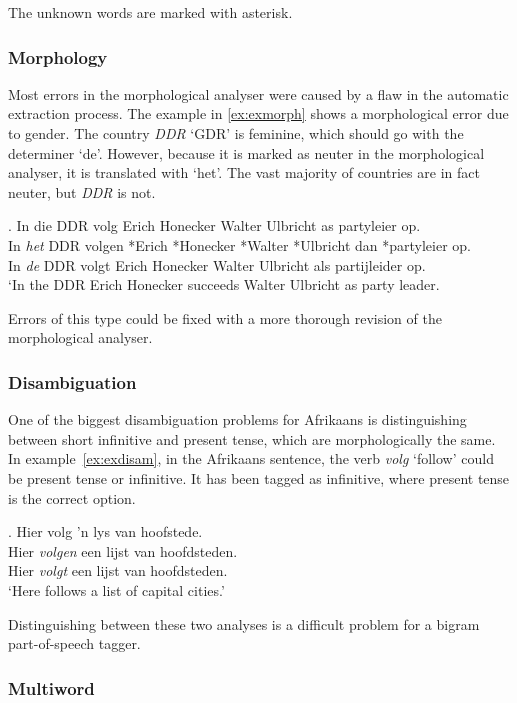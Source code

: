 \documentclass[11pt]{article}
\begin{document}
The unknown words are marked with asterisk.

\subsubsection{Morphology}

Most errors in the morphological analyser were caused by a flaw in the automatic extraction process.
The example in \ref{ex:exmorph} shows a morphological error due to gender. The 
country \emph{DDR} `GDR' is feminine, which should go with the determiner `de'. However, because 
it is marked as neuter in the morphological analyser, it is translated with `het'. The vast 
majority of countries are in fact neuter, but \emph{DDR} is not. 

\ex. \label{ex:exmorph}
    In die DDR volg Erich Honecker Walter Ulbricht as partyleier op. \\
    In {\em het} DDR volgen *Erich *Honecker *Walter *Ulbricht dan *partyleier op. \\
    In {\em de} DDR volgt Erich Honecker Walter Ulbricht als partijleider op. \\
    `In the DDR Erich Honecker succeeds Walter Ulbricht as party leader.

Errors of this type could be fixed with a more thorough revision of the morphological
analyser.

\subsubsection{Disambiguation}

One of the biggest disambiguation problems for Afrikaans is distinguishing between short infinitive and present 
tense, which are morphologically the same. In example~\ref{ex:exdisam}, in the Afrikaans sentence, the verb 
{\em volg} `follow' could be present tense or infinitive. It has been tagged as infinitive, where present tense 
is the correct option.

\ex. \label{ex:exdisam} 
    Hier volg 'n lys van hoofstede. \\
    Hier {\em volgen} een lijst van hoofdsteden. \\
    Hier {\em volgt} een lijst van hoofdsteden.  \\
   `Here follows a list of capital cities.'

Distinguishing between these two analyses is a difficult problem for a bigram part-of-speech tagger.

\subsubsection{Multiword}
\end{document}
